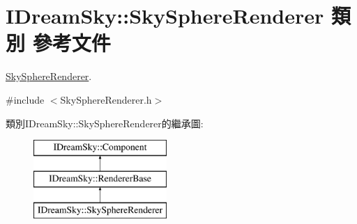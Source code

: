 \hypertarget{class_i_dream_sky_1_1_sky_sphere_renderer}{}\section{I\+Dream\+Sky\+:\+:Sky\+Sphere\+Renderer 類別 參考文件}
\label{class_i_dream_sky_1_1_sky_sphere_renderer}


\hyperlink{class_i_dream_sky_1_1_sky_sphere_renderer}{Sky\+Sphere\+Renderer}.  




{\ttfamily \#include $<$Sky\+Sphere\+Renderer.\+h$>$}

類別\+I\+Dream\+Sky\+:\+:Sky\+Sphere\+Renderer的繼承圖\+:\begin{figure}[H]
\begin{center}
\leavevmode
\includegraphics[height=3.000000cm]{class_i_dream_sky_1_1_sky_sphere_renderer}
\end{center}
\end{figure}
